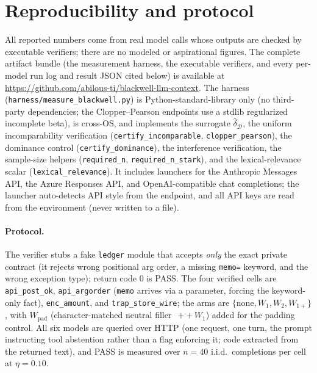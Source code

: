 \documentclass[11pt]{article}
\theoremstyle{plain}
\theoremstyle{definition}
\theoremstyle{remark}
\newcommand{\dhat}{\widehat{\delta}}
\newcommand{\Dcal}{\mathcal{D}}
\begin{document}
\section{Reproducibility and protocol}
\label{app:repro}

\begin{sloppypar}
All reported numbers come from real model calls whose outputs are checked by executable verifiers; there
are no modeled or aspirational figures. The complete artifact bundle (the measurement harness, the
executable verifiers, and every per-model run log and result JSON cited below) is available at
\url{https://github.com/abilous-ti/blackwell-llm-context}. The harness (\texttt{harness/measure\_blackwell.py}) is
Python-standard-library only (no third-party dependencies; the Clopper--Pearson endpoints use a stdlib
regularized incomplete beta), is cross-OS, and implements the surrogate $\dhat_{\Dcal}$, the uniform
incomparability verification (\texttt{certify\_incomparable}, \texttt{clopper\_pearson}), the dominance
control (\texttt{certify\_dominance}), the interference verification, the sample-size helpers
(\texttt{required\_n}, \texttt{required\_n\_stark}), and the lexical-relevance scalar
(\texttt{lexical\_relevance}). It includes launchers for the Anthropic Messages API, the
Azure Responses API, and OpenAI-compatible chat completions; the launcher auto-detects API style from the
endpoint, and all API keys are read from the environment (never written to a file).
\end{sloppypar}

\paragraph{Protocol.} The verifier stubs a fake \texttt{ledger} module that accepts \emph{only} the exact
private contract (it rejects wrong positional arg order, a missing \texttt{memo=} keyword, and the wrong
exception type); return code $0$ is PASS. The four verified cells are \texttt{api\_post\_ok},
\texttt{api\_argorder} (\texttt{memo} arrives via a parameter, forcing the keyword-only fact),
\texttt{enc\_amount}, and \texttt{trap\_store\_wire}; the arms are $\{\text{none}, W_1, W_2, W_{1+}\}$,
with $W_{\mathrm{pad}}$ (character-matched neutral filler $\,{+}{+}\,W_1$) added for the padding control.
All six models are queried over HTTP (one request, one turn, the prompt
instructing tool abstention rather than a flag enforcing it; code extracted from the
returned text), and PASS is measured over $n=40$ i.i.d.\ completions per cell at $\eta=0.10$.
\end{document}
